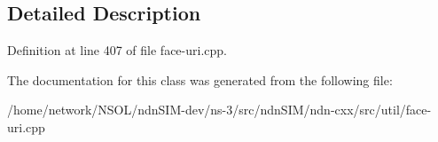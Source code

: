 \subsection{Detailed Description}


Definition at line 407 of file face-\/uri.\+cpp.



The documentation for this class was generated from the following file\+:\begin{DoxyCompactItemize}
\item 
/home/network/\+N\+S\+O\+L/ndn\+S\+I\+M-\/dev/ns-\/3/src/ndn\+S\+I\+M/ndn-\/cxx/src/util/face-\/uri.\+cpp\end{DoxyCompactItemize}
